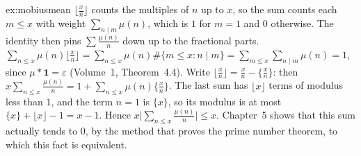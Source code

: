 \begin{solution}{ex:mobiusmean}
\idea $\lfloor\frac xn\rfloor$ counts the multiples of $n$ up to $x$, so the sum counts each $m\le x$ with weight $\sum_{n\mid m}\mu(n)$, which is $1$ for $m=1$ and $0$ otherwise.
The identity then pins $\sum\frac{\mu(n)}n$ down up to the fractional parts.
\writeup $\sum_{n\le x}\mu(n)\lfloor\frac xn\rfloor=\sum_{n\le x}\mu(n)\#\{m\le x:n\mid m\}=\sum_{m\le x}\sum_{n\mid m}\mu(n)=1$, since $\mu*\mathbf1=\varepsilon$ (Volume~1, Theorem~4.4). Write
$\lfloor\frac xn\rfloor=\frac xn-\{\frac xn\}$: then $x\sum_{n\le x}\frac{\mu(n)}n=1+\sum_{n\le x}\mu(n)\{\frac xn\}$. The last sum has $\lfloor x\rfloor$ terms of modulus less than $1$, and the term
$n=1$ is $\{x\}$, so its modulus is at most $\{x\}+\lfloor x\rfloor-1=x-1$. Hence $x\bigl|\sum_{n\le x}\frac{\mu(n)}n\bigr|\le x$. Chapter~5 shows that this sum actually tends to $0$, by the method that proves the prime number theorem, to which this
fact is equivalent.
\end{solution}

